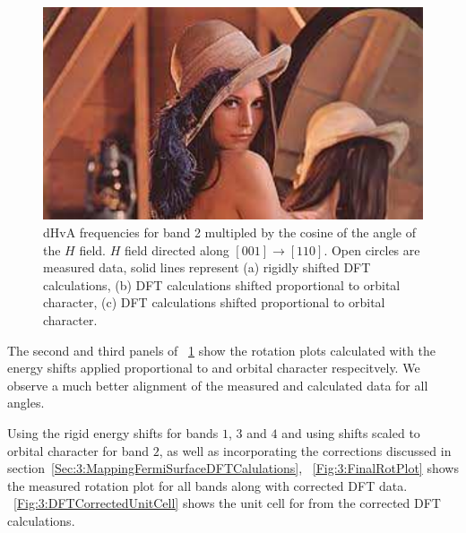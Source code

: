 \begin{figure}[h!]
    \begin{center}
        \includegraphics[scale=0.7]{Misc/TODO}
        \caption{dHvA frequencies for band 2 multipled by the cosine of the angle of the $H$ field. $H$ field directed along $[001]\rightarrow[110]$. Open circles are measured data, solid lines represent (a) rigidly shifted DFT calculations, (b) DFT calculations shifted proportional to \DzTwo orbital character, (c) DFT calculations shifted proportional to \DxzDyz orbital character.}
        \label{Fig:3:Band2DCharacterRigidComparison}
    \end{center}
\end{figure}

The second and third panels of \fig~\ref{Fig:3:Band2DCharacterRigidComparison} show the rotation plots calculated with the energy shifts applied proportional to \DzTwo and \DxzDyz orbital character respecitvely. We observe a much better alignment of the measured and calculated data for all angles.

Using the rigid energy shifts for bands $1$, $3$ and $4$ and using shifts scaled to \DzTwo orbital character for band $2$, as well as incorporating the corrections discussed in section~\ref{Sec:3:MappingFermiSurfaceDFTCalulations}, \fig~\ref{Fig:3:FinalRotPlot} shows the measured rotation plot for all bands along with corrected DFT data. \Fig~\ref{Fig:3:DFTCorrectedUnitCell} shows the unit cell for \BaFeP from the corrected DFT calculations.

